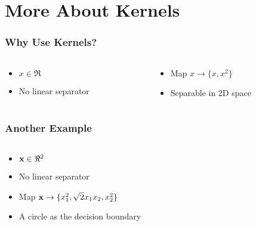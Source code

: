 \documentclass[10pt]{beamer}
\begin{document}
\section{More About Kernels}
\begin{frame}
  \frametitle{Why Use Kernels?}
  \begin{columns}
    \begin{column}{0.4\textwidth}
      \begin{itemize}
      \item $x \in \Re$
      \item No linear separator
      \end{itemize}
      \begin{figure}
      \centering
      
    \end{figure}
  \end{column}
  \begin{column}{0.5\textwidth}
    \begin{itemize}
      \item Map $x \rightarrow \{x,x^2\}$
      \item Separable in 2D space
    \end{itemize}
    \begin{figure}
      \centering
    
  \end{figure}
  \end{column}
\end{columns}
\end{frame}
\begin{frame}
      {
        \frametitle{Another Example}
      }
      \begin{columns}
        \begin{column}{0.6\textwidth}
          \begin{itemize}
            \item ${\bf x} \in \Re^2$
            \item No linear separator
            \item Map ${\bf x} \rightarrow \{x_1^2,\sqrt{2}x_1x_2,x_2^2\}$
            \item A circle as the decision boundary
          \end{itemize}
        \end{column}
        \begin{column}{0.4\textwidth}
          \begin{figure}
            \centering
            
            
          \end{figure}
        \end{column}
      \end{columns}
\end{frame}
\end{document}
